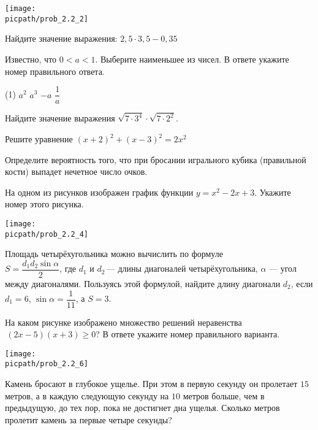\begin{training}[1]
\begin{listofex}[resume]
\begin{center}
			\texttt{[image: \\picpath/prob\_2.2\_2]}
		\end{center}
		\item Найдите значение выражения: \( 2,5\cdot3,5-0,35 \)
		\foranswer
		\item Известно, что \( 0<a<1 \). Выберите наименьшее из чисел. В ответе укажите номер правильного ответа.
		\begin{tasks}(1)
			\task \( a^2 \)
			\task \( a^3 \)
			\task \( -a \)
			\task \( \dfrac{1}{a} \)
		\end{tasks}
		\foranswer
		\item Найдите значение выражения \( \sqrt{7\cdot3^4}\cdot\sqrt{7\cdot2^2} \).
		\foranswer
		\item Решите уравнение \( (x+2)^2+(x-3)^2=2x^2 \)
		\foranswer
		\hphantom{Часть 1}
		\item Определите вероятность того, что при бросании игрального кубика (правильной кости) выпадет нечетное число очков.
		\foranswer
		\item На одном из рисунков изображен график функции \( y=x^2-2x+3 \). Укажите номер этого рисунка.
		\begin{center}
			\texttt{[image: \\picpath/prob\_2.2\_4]}
		\end{center}
		\foranswer
		\item Площадь четырёхугольника можно вычислить по формуле \\ \( S=\dfrac{d_1d_2\sin\alpha}{2} \),  где \( d_1 \) и \( d_2 \) --- длины диагоналей четырёхугольника, \( \alpha \) --- угол между диагоналями. Пользуясь этой формулой, найдите длину диагонали \( d_2 \), если \( d_1=6 \), \( \sin\alpha=\dfrac{1}{11} \), а \( S=3 \).
		\foranswer
			\end{listofex}
		\newpage
		\begin{listofex}[resume]
		\item На каком рисунке изображено множество решений неравенства\\ \( (2x-5)(x+3)\ge0 \)? В ответе укажите номер правильного варианта.
		\begin{center}
			\texttt{[image: \\picpath/prob\_2.2\_6]}
		\end{center}
		\foranswer
		\item Камень бросают в глубокое ущелье. При этом в первую секунду он пролетает \( 15 \) метров, а в каждую следующую секунду на \( 10 \) метров больше, чем в предыдущую, до тех пор, пока не достигнет дна ущелья. Сколько метров пролетит камень за первые четыре секунды?

\end{listofex}
\end{training}
